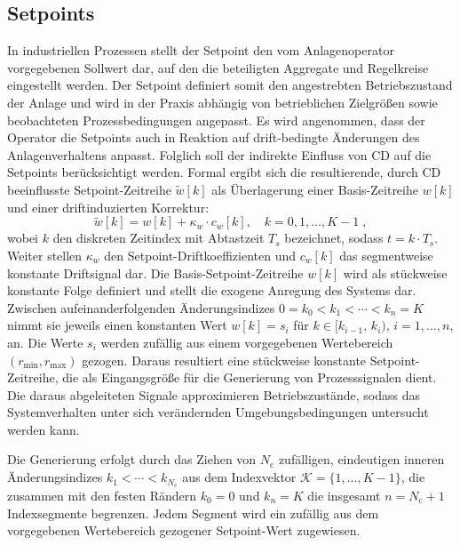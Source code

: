 \subsection{Setpoints} \label{sec:generieren_von_setpoints}
%
In industriellen Prozessen stellt der Setpoint den vom Anlagenoperator vorgegebenen Sollwert dar, auf den die beteiligten Aggregate und Regelkreise eingestellt werden. Der Setpoint definiert somit den angestrebten Betriebszustand der Anlage und wird in der Praxis abhängig von betrieblichen Zielgrößen sowie beobachteten Prozessbedingungen angepasst. Es wird angenommen, dass der Operator die Setpoints auch in Reaktion auf drift-bedingte Änderungen des Anlagenverhaltens anpasst. Folglich soll der indirekte Einfluss von \ac{CD} auf die Setpoints berücksichtigt werden. Formal ergibt sich die resultierende, durch \ac{CD} beeinflusste Setpoint-Zeitreihe $\tilde{w}[k]$ als Überlagerung einer Basis-Zeitreihe $w[k]$ und einer driftinduzierten Korrektur:
%
\begin{equation}
    \tilde{w}[k] = w[k] + \kappa_w \cdot c_w[k], \quad k = 0, 1, \dots, K-1 \; ,
\end{equation}
%
wobei $k$ den diskreten Zeitindex mit Abtastzeit $T_s$ bezeichnet, sodass $t = k \cdot T_s$. Weiter stellen $\kappa_w$ den Setpoint-Driftkoeffizienten und $c_w[k]$ das segmentweise konstante Driftsignal dar.
Die Basis-Setpoint-Zeitreihe $w[k]$ wird als stückweise konstante Folge definiert und stellt die exogene Anregung des Systems dar. Zwischen aufeinanderfolgenden Änderungsindizes $0 = k_0 < k_1 < \cdots < k_n = K$ nimmt sie jeweils einen konstanten Wert $w[k] = s_i$ für $k \in [k_{i-1},\, k_i)$, $i = 1, \dots, n$, an. Die Werte $s_i$ werden zufällig aus einem vorgegebenen Wertebereich $(r_{\min}, r_{\max})$ gezogen. Daraus resultiert eine stückweise konstante Setpoint-Zeitreihe, die als Eingangsgröße für die Generierung von Prozesssignalen dient. Die daraus abgeleiteten Signale approximieren Betriebszustände, sodass das Systemverhalten unter sich verändernden Umgebungsbedingungen untersucht werden kann. \par
Die Generierung erfolgt durch das Ziehen von $N_{\mathrm{c}}$ zufälligen, eindeutigen inneren Änderungsindizes $k_1 < \cdots < k_{N_{\mathrm{c}}}$ aus dem Indexvektor $\mathcal{K}=\{1, \dots, K-1\}$, die zusammen mit den festen Rändern $k_0 = 0$ und $k_n = K$ die insgesamt $n = N_{\mathrm{c}} + 1$ Indexsegmente begrenzen. Jedem Segment wird ein zufällig aus dem vorgegebenen Wertebereich gezogener Setpoint-Wert zugewiesen. \par
